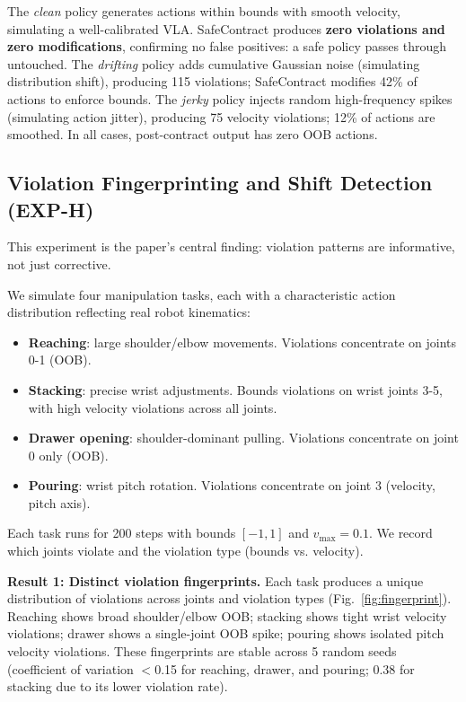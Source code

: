 \documentclass[conference]{IEEEtran}
\begin{document}
The \emph{clean} policy generates actions within bounds with smooth velocity, simulating a well-calibrated VLA.
SafeContract produces \textbf{zero violations and zero modifications}, confirming no false positives: a safe policy passes through untouched.
The \emph{drifting} policy adds cumulative Gaussian noise (simulating distribution shift), producing 115 violations; SafeContract modifies 42\% of actions to enforce bounds.
The \emph{jerky} policy injects random high-frequency spikes (simulating action jitter), producing 75 velocity violations; 12\% of actions are smoothed.
In all cases, post-contract output has zero OOB actions.

\subsection{Violation Fingerprinting and Shift Detection (EXP-H)}
\label{sec:fingerprint}

This experiment is the paper's central finding: violation patterns are informative, not just corrective.

We simulate four manipulation tasks, each with a characteristic action distribution reflecting real robot kinematics:
\begin{itemize}
    \item \textbf{Reaching}: large shoulder/elbow movements. Violations concentrate on joints 0-1 (OOB).
    \item \textbf{Stacking}: precise wrist adjustments. Bounds violations on wrist joints 3-5, with high velocity violations across all joints.
    \item \textbf{Drawer opening}: shoulder-dominant pulling. Violations concentrate on joint 0 only (OOB).
    \item \textbf{Pouring}: wrist pitch rotation. Violations concentrate on joint 3 (velocity, pitch axis).
\end{itemize}

Each task runs for 200 steps with bounds $[-1, 1]$ and $v_{\max} = 0.1$. We record which joints violate and the violation type (bounds vs. velocity).

\textbf{Result 1: Distinct violation fingerprints.}
Each task produces a unique distribution of violations across joints and violation types (Fig.~\ref{fig:fingerprint}).
Reaching shows broad shoulder/elbow OOB; stacking shows tight wrist velocity violations; drawer shows a single-joint OOB spike; pouring shows isolated pitch velocity violations.
These fingerprints are stable across 5 random seeds (coefficient of variation $<$0.15 for reaching, drawer, and pouring; 0.38 for stacking due to its lower violation rate).
\end{document}
